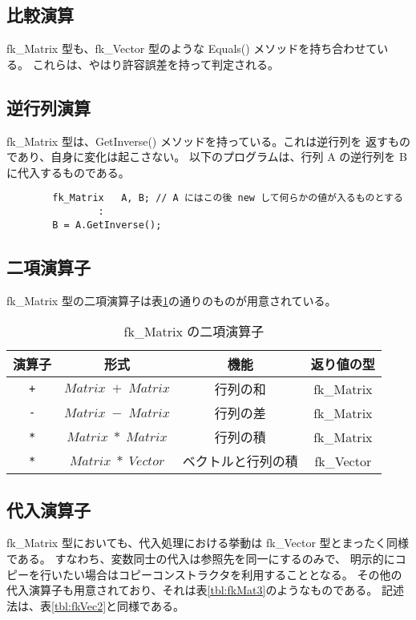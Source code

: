 \subsection{比較演算}
fk\_Matrix 型も、fk\_Vector 型のような Equals() メソッドを持ち合わせている。
これらは、やはり許容誤差を持って判定される。
\subsection{逆行列演算}
fk\_Matrix 型は、GetInverse() メソッドを持っている。これは逆行列を
返すものであり、自身に変化は起こさない。
以下のプログラムは、行列 A の逆行列を B に代入するものである。
\\
\begin{screen}
\begin{verbatim}
        fk_Matrix   A, B; // A にはこの後 new して何らかの値が入るものとする
                :
        B = A.GetInverse();
\end{verbatim}
\end{screen}
\subsection{二項演算子}
fk\_Matrix 型の二項演算子は表\ref{tbl:fkMat2}の通りのものが用意されている。
\begin{table}[H]
\caption{fk\_Matrix の二項演算子}
\label{tbl:fkMat2}
\begin{center}
\begin{tabular}{|c|c|c|c|}
\hline
演算子 & 形式 & 機能 & 返り値の型 \\ \hline \hline
\verb-+- & \(Matrix \; + \; Matrix\) & 行列の和 & fk\_Matrix \\ \hline
\verb+-+ & \(Matrix \; - \; Matrix\) & 行列の差 & fk\_Matrix \\ \hline
\verb+*+ & \(Matrix \; * \; Matrix\) & 行列の積 & fk\_Matrix \\ \hline
\verb+*+ & \(Matrix \; * \; Vector\) & ベクトルと行列の積 & fk\_Vector \\ \hline
\end{tabular}
\end{center}
\end{table}

\subsection{代入演算子}
fk\_Matrix 型においても、代入処理における挙動は fk\_Vector 型とまったく同様である。
すなわち、変数同士の代入は参照先を同一にするのみで、
明示的にコピーを行いたい場合はコピーコンストラクタを利用することとなる。
その他の代入演算子も用意されており、それは表\ref{tbl:fkMat3}のようなものである。
記述法は、表\ref{tbl:fkVec2}と同様である。

